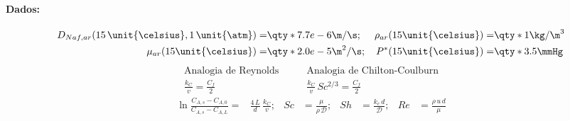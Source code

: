 \documentclass[\mainfilename]{subfiles}
\begin{document}
\begin{questionBox}
    \paragraph*{Dados:}
    \begin{align*}
        D_{Naf,ar}(15\,\unit{\celsius},1\,\unit{\atm})
        =& \qty*{7.7e-6}{\m/\s}
        ;& \rho_{ar}(15\unit{\celsius}) 
        =& \qty*{1}{\kg/\m^3}
        \\ \mu_{ar}(15\unit{\celsius}) 
        =& \qty*{2.0e-5}{\m^2/\s}
        ;& P^*(15\unit{\celsius})
        =& \qty*{3.5}{\mmHg}
    \end{align*}
    \begin{align*}
        \text{Analogia de Reynolds}
        &\qquad
        \text{Analogia de Chilton-Coulburn}
        \\
        \frac{k_C}{v}=\frac{C_f}{2}
        &\qquad
        \frac{k_C}{v}\,Sc^{2/3}=\frac{C_f}{2}
    \end{align*}
    \begin{align*}
        \ln{\frac
            {C_{A,s}-C_{A,0}}
            {C_{A,s}-C_{A,L}}
        } 
        =& \frac{4\,L}{d}
        \,\frac{k_C}{v}
        ;&
        Sc&=\frac{\mu}{\rho\,\mathscr{D}}
        ;&
        Sh&=\frac{k_c\,d}{\mathscr{D}}
        ;&
        Re&=\frac{\rho\,u\,d}{\mu}
    \end{align*}
\end{questionBox}
\end{document}
